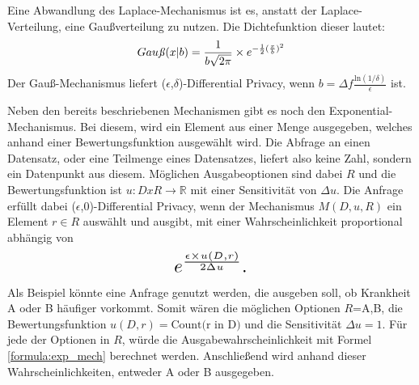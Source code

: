 Eine Abwandlung des Laplace-Mechanismus ist es, anstatt der Laplace-Verteilung, eine Gaußverteilung zu nutzen. Die Dichtefunktion dieser lautet:
\begin{equation}\label{formula:gauß}
    Gau\text{\textit{ß}}(x|b) = \frac{1}{b\sqrt{2\pi}}\times e^{-\frac{1}{2}(\frac{x}{b})^2}
\end{equation}
Der Gauß-Mechanismus liefert ($\epsilon$,$\delta$)-Differential Privacy, wenn $b = \Delta f \frac{\text{ln}(1/\delta)}{\epsilon}$ ist.

Neben den bereits beschriebenen Mechanismen gibt es noch den Exponential-Mechanismus. 
Bei diesem, wird ein Element aus einer Menge ausgegeben, welches anhand einer Bewertungsfunktion ausgewählt wird.
Die Abfrage an einen Datensatz, oder eine Teilmenge eines Datensatzes, liefert also keine Zahl, sondern ein Datenpunkt aus diesem.
Möglichen Ausgabeoptionen sind dabei $R$ und die Bewertungsfunktion ist $u:D x R \xrightarrow{} \mathbb{R}$ mit einer Sensitivität von $\Delta u$.
Die Anfrage erfüllt dabei ($\epsilon$,0)-Differential Privacy, wenn der Mechanismus $M(D,u,R)$ ein Element $r \in R$ auswählt und ausgibt, mit einer Wahrscheinlichkeit proportional abhängig von
\begin{equation}\label{formula:exp_mech}
\resizebox{0.9in}{!}{$
    e^{\frac{\epsilon \times u(D,r)}{2\Delta u}}.
$}
\end{equation}
Als Beispiel könnte eine Anfrage genutzt werden, die ausgeben soll, ob Krankheit A oder B häufiger vorkommt.
Somit wären die möglichen Optionen $R$={A,B}, die Bewertungsfunktion $u(D,r)=\text{Count(r in D)}$ und die Sensitivität $\Delta u = 1$. 
Für jede der Optionen in $R$, würde die Ausgabewahrscheinlichkeit mit Formel \ref{formula:exp_mech} berechnet werden. 
Anschließend wird anhand dieser Wahrscheinlichkeiten, entweder A oder B ausgegeben.

